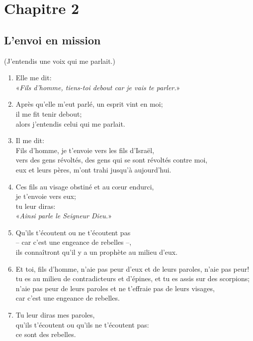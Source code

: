 \noindent
\section*{Chapitre 2}
\subsection*{L'envoi en mission}
(J'entendis une voix qui me parlait.)
\begin{enumerate}[leftmargin=\psleftmargin, labelsep = \pslabelsep, label={\arabic*}, font=\color{\pscolor}\small\textsuperscript, parsep=0em, itemsep=0em, topsep=0em ]
      \item Elle me dit: \\ \decalage «\textit{Fils d’homme, tiens-toi debout car je vais te parler.}»
      \item Après qu’elle m’eut parlé, un esprit vint en moi; \\ il me fit tenir debout; \\ alors j’entendis celui qui me parlait.
      \item Il me dit: \\ Fils d’homme, je t’envoie vers les fils d’Israël, \\ vers des gens révoltés, des gens qui se sont révoltés contre moi, \\ eux et leurs pères, m'ont trahi jusqu’à aujourd’hui.
      \item Ces fils au visage obstiné et au cœur endurci, \\ je t’envoie vers eux; \\ tu leur diras: \\ \decalage «\textit{Ainsi parle le Seigneur Dieu.}»
      \item Qu’ils t’écoutent ou ne t’écoutent pas \\ – car c’est une engeance de rebelles –, \\ ils connaîtront qu’il y a un prophète au milieu d’eux.\verseSpace
      \item Et toi, fils d’homme, n’aie pas peur d’eux et de leurs paroles, n’aie pas peur! \\ tu es au milieu de contradicteurs et d’épines, et tu es assis sur des scorpions; \\ n’aie pas peur de leurs paroles et ne t’effraie pas de leurs visages, \\ car c’est une engeance de rebelles.
      \item Tu leur diras mes paroles, \\ qu’ils t’écoutent ou qu’ils ne t’écoutent pas: \\ ce sont des rebelles. \verseSpace

\end{enumerate}
